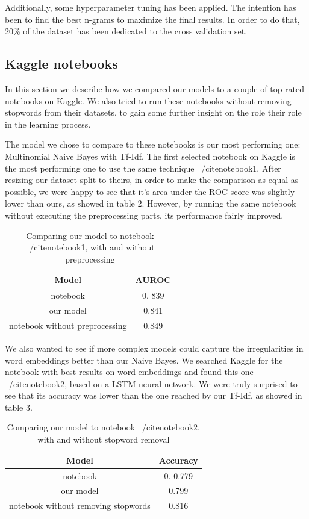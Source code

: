 Additionally, some hyperparameter tuning has been applied. The intention has been to find the best n-grams
to maximize the final results.
In order to do that, 20\% of the dataset has been dedicated to the cross validation set.

\subsection*{Kaggle notebooks}

In this section we describe how we compared our models to a couple of top-rated notebooks on Kaggle.  We also tried to run these notebooks without removing stopwords from their datasets, to gain some further insight on the role their role in the learning process. 

The model we chose to compare to these notebooks is our most performing one: Multinomial Naive Bayes with Tf-Idf.  The first selected notebook on Kaggle is the most performing one to use the same technique ~/cite{notebook1}.  After resizing our dataset split to theirs, in order to make the comparison as equal as possible,  we were happy to see that it's area under the ROC score was slightly lower than ours,  as showed in table 2.  However, by running the same notebook without executing the preprocessing parts, its performance fairly improved.

\begin{table}[h!t]
    \centering
    \caption{Comparing our model to notebook ~/cite{notebook1},  with and without preprocessing}
    \label{tab:versus_metrics}
    \begin{tabular}{c|c}
        \hline
        Model & AUROC \\
        \hline 
        notebook & 0. 839 \\ 
        our model & 0.841 \\ 
        notebook without preprocessing & 0.849 \\ 
        \hline
    \end{tabular}
\end{table}

We also wanted to see if more complex models could capture the irregularities in word embeddings better than our Naive Bayes.  We searched Kaggle for the notebook with best results on word embeddings and found this one ~/cite{notebook2},  based on a LSTM neural network.  We were truly surprised to see that its accuracy was lower than the one reached by our Tf-Idf,  as showed in table 3. 

\begin{table}[h!t]
    \centering
    \caption{Comparing our model to notebook ~/cite{notebook2},  with and without stopword removal}
    \label{tab:versus_metrics}
    \begin{tabular}{c|c}
        \hline
        Model & Accuracy\\
        \hline 
        notebook & 0. 0.779 \\ 
        our model & 0.799 \\ 
        notebook without removing stopwords & 0.816 \\ 
        \hline
    \end{tabular}
\end{table}

